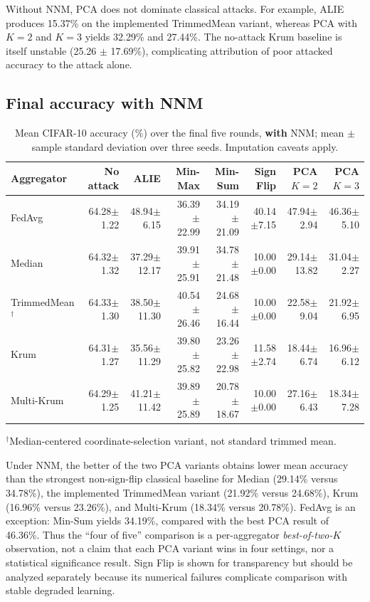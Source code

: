 \documentclass[11pt,a4paper]{article}
\begin{document}
Without NNM, PCA does not dominate classical attacks. For example, ALIE produces 15.37\% on the implemented TrimmedMean variant, whereas PCA with $K=2$ and $K=3$ yields 32.29\% and 27.44\%. The no-attack Krum baseline is itself unstable (25.26 $\pm$ 17.69\%), complicating attribution of poor attacked accuracy to the attack alone.

\subsection{Final accuracy with NNM}
\begin{table}[htbp]\centering\caption{Mean CIFAR-10 accuracy (\%) over the final five rounds, \textbf{with} NNM; mean $\pm$ sample standard deviation over three seeds. Imputation caveats apply.}\label{tab:nnm}\scriptsize\setlength{\tabcolsep}{3pt}
\begin{tabular}{lrrrrrrr}\toprule
Aggregator & No attack & ALIE & Min-Max & Min-Sum & Sign Flip & PCA $K=2$ & PCA $K=3$\\\midrule
FedAvg & 64.28$\pm$1.22 & 48.94$\pm$6.15 & 36.39$\pm$22.99 & 34.19$\pm$21.09 & 40.14$\pm$7.15 & 47.94$\pm$2.94 & 46.36$\pm$5.10\\
Median & 64.32$\pm$1.32 & 37.29$\pm$12.17 & 39.91$\pm$25.91 & 34.78$\pm$21.48 & 10.00$\pm$0.00 & 29.14$\pm$13.82 & 31.04$\pm$2.27\\
TrimmedMean$^\dagger$ & 64.33$\pm$1.30 & 38.50$\pm$11.30 & 40.54$\pm$26.46 & 24.68$\pm$16.44 & 10.00$\pm$0.00 & 22.58$\pm$9.04 & 21.92$\pm$6.95\\
Krum & 64.31$\pm$1.27 & 35.56$\pm$11.29 & 39.80$\pm$25.82 & 23.26$\pm$22.98 & 11.58$\pm$2.74 & 18.44$\pm$6.74 & 16.96$\pm$6.12\\
Multi-Krum & 64.29$\pm$1.25 & 41.21$\pm$11.42 & 39.89$\pm$25.89 & 20.78$\pm$18.67 & 10.00$\pm$0.00 & 27.16$\pm$6.43 & 18.34$\pm$7.28\\\bottomrule
\end{tabular}
\par\smallskip\raggedright\footnotesize $^\dagger$Median-centered coordinate-selection variant, not standard trimmed mean.
\end{table}

Under NNM, the better of the two PCA variants obtains lower mean accuracy than the strongest non-sign-flip classical baseline for Median (29.14\% versus 34.78\%), the implemented TrimmedMean variant (21.92\% versus 24.68\%), Krum (16.96\% versus 23.26\%), and Multi-Krum (18.34\% versus 20.78\%). FedAvg is an exception: Min-Sum yields 34.19\%, compared with the best PCA result of 46.36\%. Thus the ``four of five'' comparison is a per-aggregator \emph{best-of-two-$K$} observation, not a claim that each PCA variant wins in four settings, nor a statistical significance result. Sign Flip is shown for transparency but should be analyzed separately because its numerical failures complicate comparison with stable degraded learning.
\end{document}

